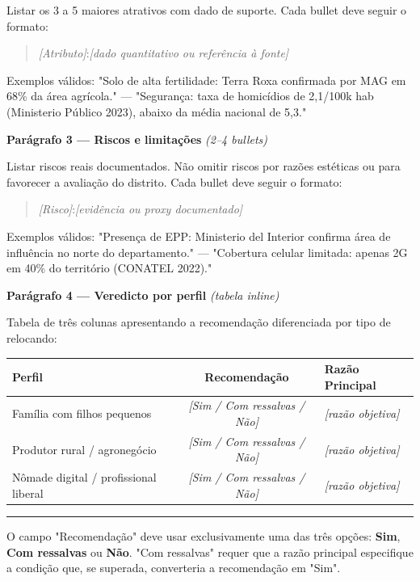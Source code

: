 Listar os 3 a 5 maiores atrativos com dado de suporte. Cada bullet deve seguir o formato:

\begin{quote}
\textit{[Atributo]}:\quad\textit{[dado quantitativo ou referência à fonte]}
\end{quote}

Exemplos válidos: "Solo de alta fertilidade: Terra Roxa confirmada por MAG em 68\% da área agrícola." — "Segurança: taxa de homicídios de 2,1/100k hab (Ministerio Público 2023), abaixo da média nacional de 5,3."

\noindent\textbf{Parágrafo 3 — Riscos e limitações} \textit{(2–4 bullets)}

Listar riscos reais documentados. Não omitir riscos por razões estéticas ou para favorecer a avaliação do distrito. Cada bullet deve seguir o formato:

\begin{quote}
\textit{[Risco]}:\quad\textit{[evidência ou proxy documentado]}
\end{quote}

Exemplos válidos: "Presença de EPP: Ministerio del Interior confirma área de influência no norte do departamento." — "Cobertura celular limitada: apenas 2G em 40\% do território (CONATEL 2022)."

\noindent\textbf{Parágrafo 4 — Veredicto por perfil} \textit{(tabela inline)}

Tabela de três colunas apresentando a recomendação diferenciada por tipo de relocando:

\medskip
\begin{tabularx}{\linewidth}{|l|c|X|}
\hline
\textbf{Perfil} & \textbf{Recomendação} & \textbf{Razão Principal} \\
\hline
Família com filhos pequenos      & \textit{[Sim / Com ressalvas / Não]} & \textit{[razão objetiva]} \\
\hline
Produtor rural / agronegócio     & \textit{[Sim / Com ressalvas / Não]} & \textit{[razão objetiva]} \\
\hline
Nômade digital / profissional liberal & \textit{[Sim / Com ressalvas / Não]} & \textit{[razão objetiva]} \\
\hline
\end{tabularx}

\medskip
\noindent\rule{\linewidth}{0.4pt}
\bigskip

O campo "Recomendação" deve usar exclusivamente uma das três opções: \textbf{Sim}, \textbf{Com ressalvas} ou \textbf{Não}. "Com ressalvas" requer que a razão principal especifique a condição que, se superada, converteria a recomendação em "Sim".

